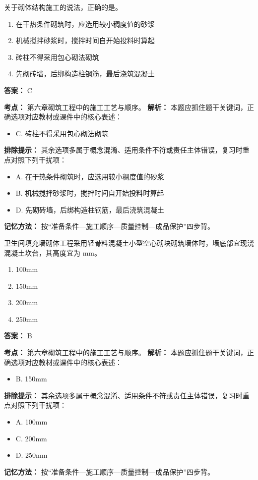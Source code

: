 \documentclass[UTF8,fontset=fandol,11pt]{ctexart}
\begin{document}
\begin{quizbox}[title={第 30 题}]
关于砌体结构施工的说法，正确的是。\\
\begin{enumerate}[label=\Alph*.]
\item 在干热条件砌筑时，应选用较小稠度值的砂浆
\item 机械搅拌砂浆时，搅拌时间自开始投料时算起
\item 砖柱不得采用包心砌法砌筑
\item 先砌砖墙，后绑构造柱钢筋，最后浇筑混凝土
\end{enumerate}
\textbf{答案：} C
\vspace{0.25em}
\begin{answerbox}[title={考点解析}]
\textbf{考点：} 第六章砌筑工程中的施工工艺与顺序。
\textbf{解析：} 本题应抓住题干关键词，正确选项对应教材或课件中的核心表述：
\begin{itemize}
\item C. 砖柱不得采用包心砌法砌筑
\end{itemize}
\textbf{排除提示：} 其余选项多属于概念混淆、适用条件不符或责任主体错误，复习时重点对照下列干扰项：
\begin{itemize}
\item A. 在干热条件砌筑时，应选用较小稠度值的砂浆
\item B. 机械搅拌砂浆时，搅拌时间自开始投料时算起
\item D. 先砌砖墙，后绑构造柱钢筋，最后浇筑混凝土
\end{itemize}
\textbf{记忆方法：} 按“准备条件—施工顺序—质量控制—成品保护”四步背。
\end{answerbox}
\end{quizbox}

\begin{quizbox}[title={第 31 题}]
卫生间填充墙砌体工程采用轻骨料混凝土小型空心砌块砌筑墙体时，墙底部宜现浇混凝土坎台，其高度宜为 mm。\\
\begin{enumerate}[label=\Alph*.]
\item 100mm
\item 150mm
\item 200mm
\item 250mm
\end{enumerate}
\textbf{答案：} B
\vspace{0.25em}
\begin{answerbox}[title={考点解析}]
\textbf{考点：} 第六章砌筑工程中的施工工艺与顺序。
\textbf{解析：} 本题应抓住题干关键词，正确选项对应教材或课件中的核心表述：
\begin{itemize}
\item B. 150mm
\end{itemize}
\textbf{排除提示：} 其余选项多属于概念混淆、适用条件不符或责任主体错误，复习时重点对照下列干扰项：
\begin{itemize}
\item A. 100mm
\item C. 200mm
\item D. 250mm
\end{itemize}
\textbf{记忆方法：} 按“准备条件—施工顺序—质量控制—成品保护”四步背。
\end{answerbox}
\end{quizbox}
\end{document}
